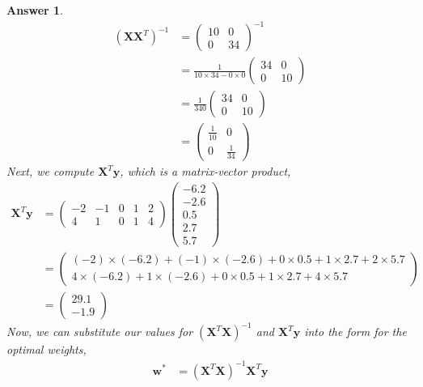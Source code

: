 \documentclass{article}
\newtheorem{answer}{Answer}
\newcommand{\bracket}[3]{\left#1 #3 \right#2}
\renewcommand{\b}{\bracket{(}{)}}
\newcommand{\y}{\mathbf{y}}
\newcommand{\X}{\mathbf{X}}
\newcommand{\w}{\mathbf{w}}
\newcommand{\wo}{\w^*}
\begin{document}
\begin{answer}
\begin{align}
    \b{\X \X^T}^{-1} &=  \begin{pmatrix}
      10 & 0 \\ 0 & 34
    \end{pmatrix}^{-1} \\
    &= \frac{1}{10\times 34 - 0 \times 0} \begin{pmatrix} 34 & 0 \\ 0 & 10 \end{pmatrix} \\
    &= \frac{1}{340}\begin{pmatrix} 34 & 0 \\ 0 & 10 \end{pmatrix} \\
    &= \begin{pmatrix} \tfrac{1}{10} & 0 \\ 0 & \tfrac{1}{34} \end{pmatrix}
  \end{align}
  Next, we compute $\X^T \y$, which is a matrix-vector product,
  \begin{align}
    \X^T \y &= 
    \begin{pmatrix}
      -2 & -1 & 0 & 1 & 2\\
      4 & 1 & 0 & 1 & 4
    \end{pmatrix}
    \begin{pmatrix}
      -6.2\\
      -2.6\\
       0.5\\
       2.7\\
       5.7
    \end{pmatrix}\\
    &=
    \begin{pmatrix}
      {(-2) {\times} (-6.2) + (-1) {\times} (-2.6) + 0 {\times} 0.5 + 1 {\times} 2.7 + 2{\times} 5.7}\\
      {4 {\times} (-6.2) + 1 {\times} (-2.6) + 0 {\times} 0.5 + 1 {\times} 2.7 + 4{\times} 5.7}
    \end{pmatrix}\\
    &= 
    \begin{pmatrix}
      29.1\\
      -1.9
    \end{pmatrix}
  \end{align}
  Now, we can substitute our values for $\b{\X^T \X}^{-1}$ and $\X^T \y$ into the form for the optimal weights,
  \begin{align}
    \wo &= \b{\X^T \X}^{-1} \X^T \y\\

\end{align}
\end{answer}
\end{document}
